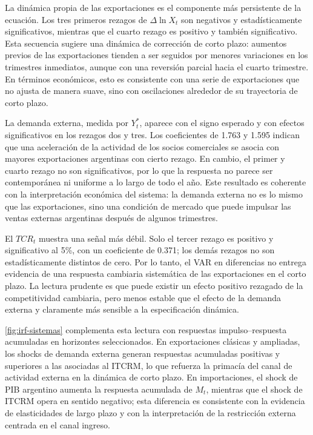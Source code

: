 \documentclass[11pt,a4paper]{article}
\begin{document}
	La dinámica propia de las exportaciones es el componente más persistente de la
	ecuación. Los tres primeros rezagos de \(\Delta \ln X_t\) son negativos y
	estadísticamente significativos, mientras que el cuarto rezago es positivo y
	también significativo. Esta secuencia sugiere una dinámica de corrección de
	corto plazo: aumentos previos de las exportaciones tienden a ser seguidos por
	menores variaciones en los trimestres inmediatos, aunque con una reversión
	parcial hacia el cuarto trimestre. En términos económicos, esto es consistente
	con una serie de exportaciones que no ajusta de manera suave, sino con
	oscilaciones alrededor de su trayectoria de corto plazo.

	La demanda externa, medida por \(Y_t^*\), aparece con el signo esperado y con
	efectos significativos en los rezagos dos y tres. Los coeficientes de 1.763 y
	1.595 indican que una aceleración de la actividad de los socios comerciales se
	asocia con mayores exportaciones argentinas con cierto rezago. En cambio, el
	primer y cuarto rezago no son significativos, por lo que la respuesta no parece
	ser contemporánea ni uniforme a lo largo de todo el año. Este resultado es
	coherente con la interpretación económica del sistema: la demanda externa no es
	lo mismo que las exportaciones, sino una condición de mercado que puede impulsar
	las ventas externas argentinas después de algunos trimestres.

	El \(TCR_t\) muestra una señal más débil. Solo el tercer rezago es positivo y
	significativo al 5\%, con un coeficiente de 0.371; los demás rezagos no son
	estadísticamente distintos de cero. Por lo tanto, el VAR en diferencias no
	entrega evidencia de una respuesta cambiaria sistemática de las exportaciones
	en el corto plazo. La lectura prudente es que puede existir un efecto positivo
	rezagado de la competitividad cambiaria, pero menos estable que el efecto de la
	demanda externa y claramente más sensible a la especificación dinámica.

	\autoref{fig:irf-sistemas} complementa esta lectura con respuestas
	impulso--respuesta acumuladas en horizontes seleccionados. En exportaciones
	clásicas y ampliadas, los shocks de demanda externa generan respuestas
	acumuladas positivas y superiores a las asociadas al ITCRM, lo que refuerza la
	primacía del canal de actividad externa en la dinámica de corto plazo. En
	importaciones, el shock de PIB argentino aumenta la respuesta acumulada de
	\(M_t\), mientras que el shock de ITCRM opera en sentido negativo; esta
	diferencia es consistente con la evidencia de elasticidades de largo plazo y
	con la interpretación de la restricción externa centrada en el canal ingreso.
\end{document}
